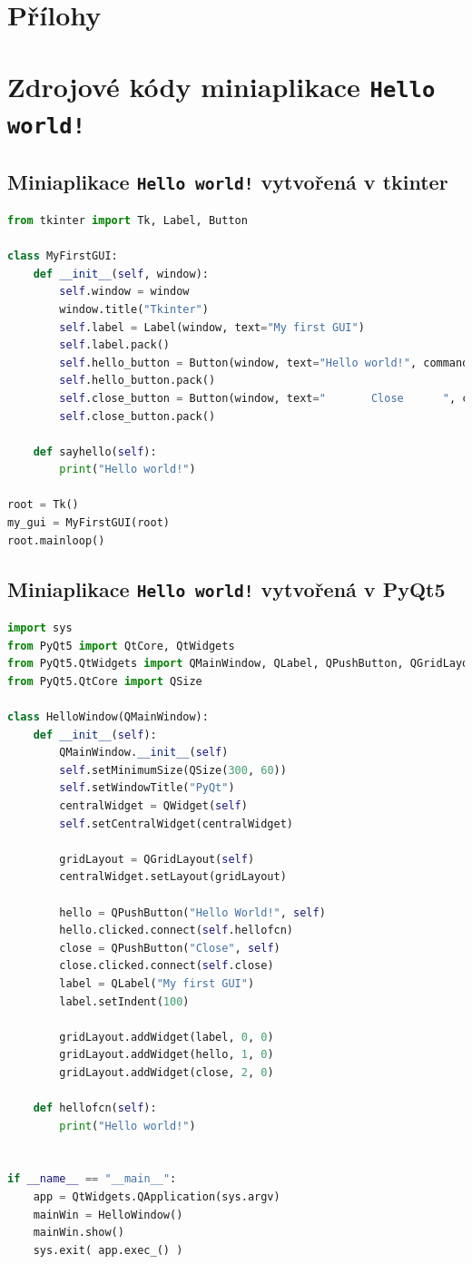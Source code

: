 \documentclass[a4paper, 12pt]{article}
\begin{document}
\newpage
\listoffigures

\newpage
\section*{Přílohy}
\appendix
\section{Zdrojové kódy miniaplikace \texttt{Hello world!}}
\label{PrilohaA}
\subsection{Miniaplikace \texttt{Hello world!} vytvořená v tkinter}
\begin{lstlisting}[language=Python]
from tkinter import Tk, Label, Button

class MyFirstGUI:
    def __init__(self, window):
        self.window = window
        window.title("Tkinter")
        self.label = Label(window, text="My first GUI")
        self.label.pack()
        self.hello_button = Button(window, text="Hello world!", command=self.sayhello)
        self.hello_button.pack()
        self.close_button = Button(window, text="       Close      ", command=window.quit)
        self.close_button.pack()

    def sayhello(self):
        print("Hello world!")

root = Tk()
my_gui = MyFirstGUI(root)
root.mainloop()
\end{lstlisting}
\newpage
\subsection{Miniaplikace \texttt{Hello world!} vytvořená v PyQt5}
\begin{lstlisting}[language=Python]
import sys
from PyQt5 import QtCore, QtWidgets
from PyQt5.QtWidgets import QMainWindow, QLabel, QPushButton, QGridLayout, QWidget
from PyQt5.QtCore import QSize

class HelloWindow(QMainWindow):
    def __init__(self):
        QMainWindow.__init__(self)
        self.setMinimumSize(QSize(300, 60))
        self.setWindowTitle("PyQt")
        centralWidget = QWidget(self)
        self.setCentralWidget(centralWidget)

        gridLayout = QGridLayout(self)
        centralWidget.setLayout(gridLayout)

        hello = QPushButton("Hello World!", self)
        hello.clicked.connect(self.hellofcn)
        close = QPushButton("Close", self)
        close.clicked.connect(self.close)
        label = QLabel("My first GUI")
        label.setIndent(100)

        gridLayout.addWidget(label, 0, 0)
        gridLayout.addWidget(hello, 1, 0)
        gridLayout.addWidget(close, 2, 0)

    def hellofcn(self):
        print("Hello world!")


if __name__ == "__main__":
    app = QtWidgets.QApplication(sys.argv)
    mainWin = HelloWindow()
    mainWin.show()
    sys.exit( app.exec_() )
\end{lstlisting}
%
\end{document}
